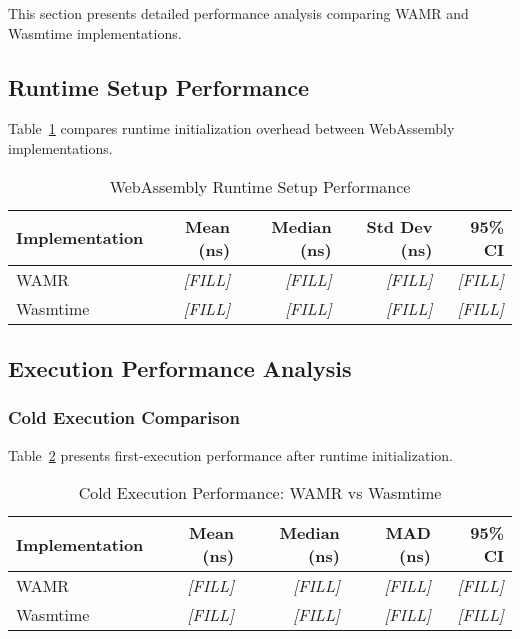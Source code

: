 This section presents detailed performance analysis comparing WAMR and Wasmtime implementations.

\subsection{Runtime Setup Performance}
\label{subsec:setup-performance}

Table~\ref{tab:setup-performance} compares runtime initialization overhead between WebAssembly implementations.

\begin{table}[htbp]
\centering
\caption{WebAssembly Runtime Setup Performance}
\label{tab:setup-performance}
\begin{tabular}{lrrrr}
\toprule
\textbf{Implementation} & \textbf{Mean (ns)} & \textbf{Median (ns)} & \textbf{Std Dev (ns)} & \textbf{95\% CI} \\
\midrule
WAMR          & \textit{[FILL]} & \textit{[FILL]} & \textit{[FILL]} & \textit{[FILL]} \\
Wasmtime      & \textit{[FILL]} & \textit{[FILL]} & \textit{[FILL]} & \textit{[FILL]} \\
\bottomrule
\end{tabular}
\end{table}


\subsection{Execution Performance Analysis}
\label{subsec:execution-performance}

\subsubsection{Cold Execution Comparison}
\label{subsubsec:cold-execution}

Table~\ref{tab:cold-performance} presents first-execution performance after runtime initialization.

\begin{table}[htbp]
\centering
\caption{Cold Execution Performance: WAMR vs Wasmtime}
\label{tab:cold-performance}
\begin{tabular}{lrrrr}
\toprule
\textbf{Implementation} & \textbf{Mean (ns)} & \textbf{Median (ns)} & \textbf{MAD (ns)} & \textbf{95\% CI} \\
\midrule
WAMR          & \textit{[FILL]} & \textit{[FILL]} & \textit{[FILL]} & \textit{[FILL]} \\
Wasmtime      & \textit{[FILL]} & \textit{[FILL]} & \textit{[FILL]} & \textit{[FILL]} \\
\bottomrule
\end{tabular}
\end{table}

